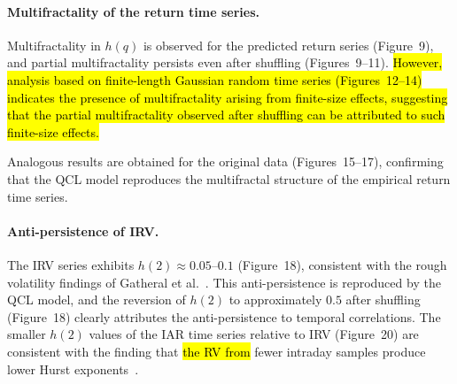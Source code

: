 \documentclass[preprints,article,accept,pdftex,oneauthor]{Definitions/mdpi}
\begin{document}
\paragraph{Multifractality of the return time series.}
 Multifractality in $h(q)$ is observed for the predicted return series
(Figure~9), and partial multifractality persists even after shuffling
(Figures~9--11). \hl{However, analysis based on finite-length Gaussian random time series (Figures~12--14) indicates the presence of multifractality arising from finite-size effects, suggesting that the partial multifractality observed after shuffling can be attributed to such finite-size effects.}

Analogous results are obtained for the original data (Figures~15--17),
confirming that the QCL model reproduces the multifractal
structure of the empirical return time series.
 
\paragraph{Anti-persistence of IRV.}
The IRV series exhibits $h(2) \approx 0.05$--$0.1$ (Figure~18),
consistent with the rough volatility findings of Gatheral et
al.~\cite{gatheral2018volatility}. This anti-persistence is reproduced by the
QCL model, and the reversion of $h(2)$ to approximately
$0.5$ after shuffling (Figure~18) clearly attributes the
anti-persistence to temporal correlations. The smaller $h(2)$ values
of the IAR time series relative to IRV (Figure~20) are consistent with the
finding that \hl{the RV from} fewer intraday samples produce lower Hurst exponents~\cite{takaishi2025multifractality}.
 
 
\end{document}
